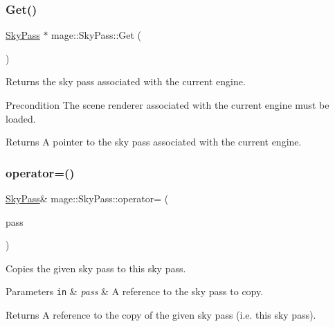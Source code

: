 \subsubsection{\texorpdfstring{Get()}{Get()}}
{\footnotesize\ttfamily \hyperlink{classmage_1_1_sky_pass}{Sky\+Pass} $\ast$ mage\+::\+Sky\+Pass\+::\+Get (\begin{DoxyParamCaption}{ }\end{DoxyParamCaption})\hspace{0.3cm}{\ttfamily [static]}}

Returns the sky pass associated with the current engine.

\begin{DoxyPrecond}{Precondition}
The scene renderer associated with the current engine must be loaded. 
\end{DoxyPrecond}
\begin{DoxyReturn}{Returns}
A pointer to the sky pass associated with the current engine. 
\end{DoxyReturn}
\hypertarget{classmage_1_1_sky_pass_aba0111417b69724799b8cc94ac4d8af6}{}\label{classmage_1_1_sky_pass_aba0111417b69724799b8cc94ac4d8af6} 
\subsubsection{\texorpdfstring{operator=()}{operator=()}\hspace{0.1cm}{\footnotesize\ttfamily [1/2]}}
{\footnotesize\ttfamily \hyperlink{classmage_1_1_sky_pass}{Sky\+Pass}\& mage\+::\+Sky\+Pass\+::operator= (\begin{DoxyParamCaption}\item[{const \hyperlink{classmage_1_1_sky_pass}{Sky\+Pass} \&}]{pass }\end{DoxyParamCaption})\hspace{0.3cm}{\ttfamily [delete]}}

Copies the given sky pass to this sky pass.


\begin{DoxyParams}[1]{Parameters}
\mbox{\tt in}  & {\em pass} & A reference to the sky pass to copy. \\
\hline
\end{DoxyParams}
\begin{DoxyReturn}{Returns}
A reference to the copy of the given sky pass (i.\+e. this sky pass). 
\end{DoxyReturn}
\hypertarget{classmage_1_1_sky_pass_ab8b0fee280f8b13f335ff33b7d153755}{}\label{classmage_1_1_sky_pass_ab8b0fee280f8b13f335ff33b7d153755} 
